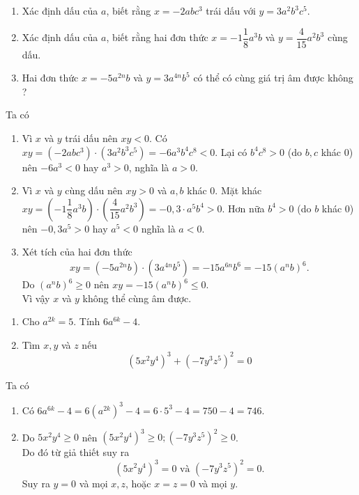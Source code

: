 \begin{vd}%
	\begin{enumerate}
		\item Xác định dấu của $ a $, biết rằng $ x=-2abc^3 $ trái dấu với $ y=3a^2b^3c^5 $.
		\item Xác định dấu của $ a $, biết rằng hai đơn thức $ x=-1\dfrac{1}{8} a^3b$ và $ y=\dfrac{4}{15}a^2b^3 $ cùng dấu.
		\item Hai đơn thức $ x=-5a^{2n}b $ và $ y=3a^{4n}b^5 $ có thể có cùng giá trị âm được không ?
	\end{enumerate}
	\loigiai
	{
		Ta có
		\begin{enumerate}
			\item Vì $ x $ và $ y $ trái dấu nên $ xy<0 $. Có $ xy=(-2abc^3) \cdot (3a^2b^3c^5)=-6a^3b^4c^8<0 $. Lại có $ b^4c^8 >0 $ (do $ b,c $ khác $ 0 $) nên $ -6a^3 <0 $ hay $ a^3>0 $, nghĩa là $ a>0 $.
			\item Vì $ x $ và $ y $ cùng dấu nên $ xy>0 $ và $ a,b $ khác $ 0 $. Mặt khác $ xy=(-1\dfrac{1}{8}a^3b) \cdot (\dfrac{4}{15}a^2b^3)=-0,3 \cdot a^5b^4 >0 $. Hơn nữa $ b^4>0 $ (do $ b $ khác $ 0 $) nên $ -0,3a^5 >0 $ hay $ a^5<0 $ nghĩa là $ a<0 $.
			\item Xét tích của hai đơn thức 
			\[ xy = (-5a^{2n}b) \cdot (3a^{4n}b^5) = -15 a^{6n}b^6=-15(a^nb)^6 .\]
			Do $ (a^nb)^6 \ge 0 $ nên $ xy=-15(a^nb)^6 \le 0 $. \\
			Vì vậy $ x $ và $ y $ không thể cùng âm được.
		\end{enumerate}
	}
\end{vd}

\begin{vd}%
	\begin{enumerate}
		\item Cho $ a^{2k}=5 $. Tính $ 6a^{6k}-4 $.
		\item Tìm $ x,y $ và $ z $ nếu \[ (5x^2y^4)^3+(-7y^3z^5)^2=0 \]
	\end{enumerate}
	\loigiai
	{
		Ta có
		\begin{enumerate}
			\item Có $ 6a^{6k}-4=6 (a^{2k})^3 - 4 = 6 \cdot 5^3 - 4 = 750-4=746 $.
			\item Do $ 5x^2y^4 \ge 0 $ nên $ (5x^2y^4)^3 \ge 0 ; (-7y^3z^5)^2 \ge 0 $.\\
			Do đó từ giả thiết suy ra $$ (5x^2y^4)^3 = 0  \text{ và } (-7y^3z^5)^2 = 0. $$
			Suy ra $ y=0 $ và mọi $ x,z $, hoặc $ x=z=0 $ và mọi $ y $.
		\end{enumerate}
	}
\end{vd}

